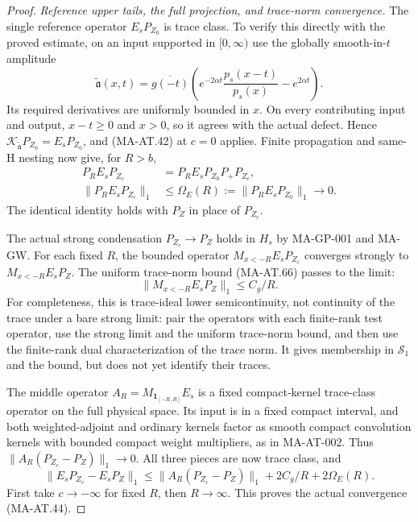 \begin{proof}
\emph{Reference upper tails, the full projection, and trace-norm convergence.}
The single reference operator \(E_sP_{Z_0}\) is trace class.
To verify this directly with the proved estimate, on an input
supported in \([0,\infty)\) use the globally smooth-in-\(t\)
amplitude
\[
 \widetilde{\mathfrak a}(x,t)
  =\overline{g(-t)}
       \left(e^{-2\alpha t}\frac{p_s(x-t)}{p_s(x)}
                              -e^{2\alpha t}\right).
 \tag{MA-AT.67}
\]
Its required derivatives are uniformly bounded in \(x\).
On every contributing input and output, \(x-t\ge0\)
and \(x>0\), so it agrees with the actual defect.
Hence \(\mathcal K_{\widetilde{\mathfrak a}}P_{Z_0}
=E_sP_{Z_0}\), and (MA-AT.42) at \(c=0\) applies.
Finite propagation and same-H nesting now give, for \(R>b\),
\[
 \begin{aligned}
 P_RE_sP_{Z_c}
     &=P_RE_sP_{Z_0}P_+P_{Z_c},\\
 \|P_RE_sP_{Z_c}\|_1
     &\le\Omega_E(R):=\|P_RE_sP_{Z_0}\|_1
                                  \longrightarrow0 .
 \end{aligned}
 \tag{MA-AT.68}
\]
The identical identity holds with \(P_Z\) in place of \(P_{Z_c}\).

The actual strong condensation \(P_{Z_c}\to P_Z\) holds
in \(H_s\) by MA-GP-001 and MA-GW.
For each fixed \(R\), the bounded operator
\(M_{x<-R}E_sP_{Z_c}\) converges strongly to
\(M_{x<-R}E_sP_Z\).
The uniform trace-norm bound (MA-AT.66) passes to the limit:
\[
                  \|M_{x<-R}E_sP_Z\|_1\le C_g/R .
 \tag{MA-AT.69}
\]
For completeness, this is trace-ideal lower semicontinuity,
not continuity of the trace under a bare strong limit:
pair the operators with each finite-rank test operator,
use the strong limit and the uniform trace-norm bound,
and then use the finite-rank dual characterization of
the trace norm.  It gives membership in \(\mathcal S_1\)
and the bound, but does not yet identify their traces.

The middle operator \(A_R=M_{\mathbf1_{[-R,R]}}E_s\)
is a fixed compact-kernel trace-class operator on the full
physical space.  Its input is in a fixed compact interval,
and both weighted-adjoint and ordinary kernels factor as
smooth compact convolution kernels with bounded compact
weight multipliers, as in MA-AT-002.
Thus \(\|A_R(P_{Z_c}-P_Z)\|_1\to0\).
All three pieces are now trace class, and
\[
 \|E_sP_{Z_c}-E_sP_Z\|_1
   \le \|A_R(P_{Z_c}-P_Z)\|_1
                   +2C_g/R+2\Omega_E(R).
 \tag{MA-AT.70}
\]
First take \(c\to-\infty\) for fixed \(R\), then \(R\to\infty\).
This proves the actual convergence (MA-AT.44).


\end{proof}
